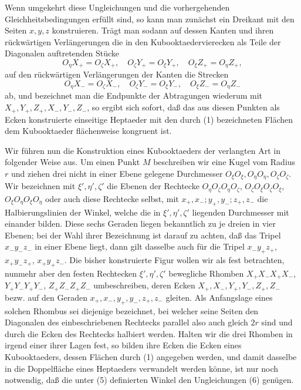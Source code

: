 \documentclass[11pt,a4paper]{article}
\begin{document}
Wenn umgekehrt diese Ungleichungen und die vorhergehenden Gleichheitsbedingungen erf\"ullt sind, so kann man zun\"achst ein Dreikant mit den Seiten $x,y,z$ konstruieren. Tr\"agt man sodann auf dessen Kanten und ihren r\"uckw\"artigen Verl\"angerungen die in den Kubooktaedervierecken als Teile der Diagonalen auftretenden St\"ucke
\[
O_\eta X_+=O_\zeta X_+,
\quad O_\zeta Y_+=O_\xi Y_+,
\quad O_\xi Z_+=O_\eta Z_+,
\]
auf den r\"uckw\"artigen Verl\"angerungen der Kanten die Strecken
\[
O_\eta X_-=O_\zeta X_-,
\quad O_\zeta Y_-=O_\xi Y_-,
\quad O_\xi Z_-=O_\eta Z_-
\]
ab, und bezeichnet man die Endpunkte der Abtragungen wiederum mit $X_+,Y_+,Z_+,X_-,Y_-,Z_-$, so ergibt sich sofort, da\ss{} das aus diesen Punkten als Ecken konstruierte einseitige Heptaeder mit den durch (1) bezeichneten Fl\"achen dem Kubooktaeder fl\"achenweise kongruent ist.

Wir f\"uhren nun die Konstruktion eines Kubooktaeders der verlangten Art in folgender Weise aus. Um einen Punkt $M$ beschreiben wir eine Kugel vom Radius $r$ und ziehen drei nicht in einer Ebene gelegene Durchmesser $O_\xi O_\xi,O_\eta O_\eta,O_\zeta O_\zeta$. Wir bezeichnen mit $\xi',\eta',\zeta'$ die Ebenen der Rechtecke $O_\eta O_\zeta O_\eta O_\zeta$, $O_\zeta O_\xi O_\zeta O_\xi$, $O_\xi O_\eta O_\xi O_\eta$ oder auch diese Rechtecke selbst, mit $x_+,x_-;y_+,y_-;z_+,z_-$ die Halbierungslinien der Winkel, welche die in $\xi',\eta',\zeta'$ liegenden Durchmesser mit einander bilden. Diese sechs Geraden liegen bekanntlich zu je dreien in vier Ebenen; bei der Wahl ihrer Bezeichnung ist darauf zu achten, da\ss{} das Tripel $x_-y_-z_-$ in einer Ebene liegt, dann gilt dasselbe auch f\"ur die Tripel $x_-y_+z_+$, $x_+y_-z_+$, $x_+y_+z_-$. Die bisher konstruierte Figur wollen wir als fest betrachten, nunmehr aber den festen Rechtecken $\xi',\eta',\zeta'$ bewegliche Rhomben $X_+X_-X_+X_-$, $Y_+Y_-Y_+Y_-$, $Z_+Z_-Z_+Z_-$ umbeschreiben, deren Ecken $X_+,X_-,Y_+,Y_-,Z_+,Z_-$ bezw. auf den Geraden $x_+,x_-,y_+,y_-,z_+,z_-$ gleiten. Als Anfangslage eines solchen Rhombus sei diejenige bezeichnet, bei welcher seine Seiten den Diagonalen des einbeschriebenen Rechtecks parallel also auch gleich $2r$ sind und durch die Ecken des Rechtecks halbiert werden. Halten wir die drei Rhomben in irgend einer ihrer Lagen fest, so bilden ihre Ecken die Ecken eines Kubooktaeders, dessen Fl\"achen durch (1) angegeben werden, und damit dasselbe in die Doppelfl\"ache eines Heptaeders verwandelt werden k\"onne, ist nur noch notwendig, da\ss{} die unter (5) definierten Winkel den Ungleichungen (6) gen\"ugen.
\end{document}
